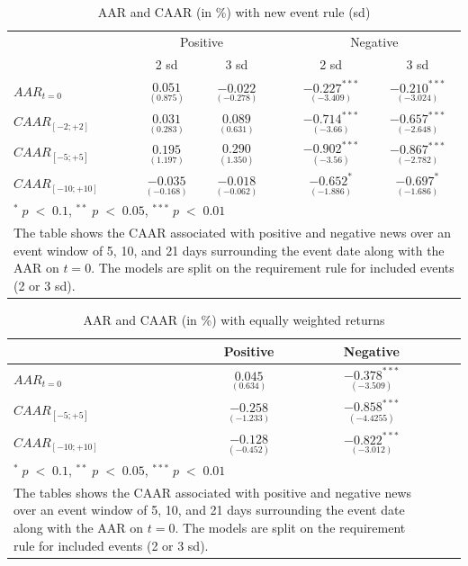 \begin{table}[H]
\centering
\caption{AAR and CAAR (in \%) with new event rule (sd)} 
\begin{tabular}{lccccc}
  \hline  \hline
  & \multicolumn{2}{c}{Positive} &  & \multicolumn{2}{c}{Negative}\\ \cline{2-3} \cline{5-6}  
  & 2 sd & 3 sd & & 2 sd & 3 sd   \\   
 \hline
$AAR_{t=0}$ & $\underset{(0.875)}{0.051}$ & $\underset{(-0.278)}{-0.022}$ & & $\underset{(-3.409)}{-0.227^{***}}$ & $\underset{(-3.024)}{-0.210^{***}}$ \\ 
$CAAR_{[-2;+2]}$  & $\underset{(0.283)}{0.031}$  & $\underset{(0.631)}{0.089}$ & & $\underset{(-3.66)}{-0.714^{***}}$ & $\underset{(-2.648)}{-0.657^{***}}$ \\ 
$CAAR_{[-5;+5]}$  & $\underset{(1.197)}{0.195}$  & $\underset{(1.350)}{0.290}$ & &$\underset{(-3.56)}{-0.902^{***}}$ & $\underset{(-2.782)}{-0.867^{***}}$ \\ 
$CAAR_{[-10;+10]}$  & $\underset{(-0.168)}{-0.035}$  & $\underset{(-0.062)}{-0.018}$ &  & $\underset{(-1.886)}{-0.652^{*}}$ & $\underset{(-1.686)}{-0.697^{*}}$  \\
   \hline \hline
   \multicolumn{6}{p{12cm}}{ \footnotesize $^* \; p\; <\; 0.1$, $ ^{**} \; p\; <\; 0.05$, $ ^{***} \; p\; <\; 0.01$  } \\
   \multicolumn{6}{p{13cm}}{\footnotesize The table shows the CAAR associated with positive and negative news over an event window of 5, 10, and 21 days surrounding the event date along with the AAR on $t=0$. The models are split on the requirement rule for included events (2 or 3 sd).} \\
   \hline
\end{tabular}
\label{tab:ST_sensitivity}
\end{table}


\begin{table}[H]
\centering
\caption{AAR and CAAR (in \%) with equally weighted returns} 
\begin{tabular}{lcccc}
  \hline  \hline
  & \multicolumn{1}{c}{Positive} &  \multicolumn{1}{c}{Negative}\\  
 \hline
$AAR_{t=0}$ &  $\underset{(0.634)}{0.045}$ & $\underset{(-3.509)}{-0.378^{***}}$ \\  
$CAAR_{[-5;+5]}$  & $\underset{(-1.233)}{-0.258}$ & $\underset{(-4.4255)}{-0.858^{***}}$ \\ 
$CAAR_{[-10;+10]}$    & $\underset{(-0.452)}{-0.128 }$ & $\underset{(-3.012)}{-0.822^{***}}$ \\ 
   \hline \hline
   \multicolumn{3}{p{10cm}}{ \footnotesize $^* \; p\; <\; 0.1$, $ ^{**} \; p\; <\; 0.05$, $ ^{***} \; p\; <\; 0.01$  } \\
   \multicolumn{3}{p{10cm}}{\footnotesize The tables shows the CAAR associated with positive and negative news over an event window of 5, 10, and 21 days surrounding the event date along with the AAR on $t=0$. The models are split on the requirement rule for included events (2 or 3 sd).} \\
   \hline
\end{tabular}
\label{tab:ST_sensitivity_weights}
\end{table}


